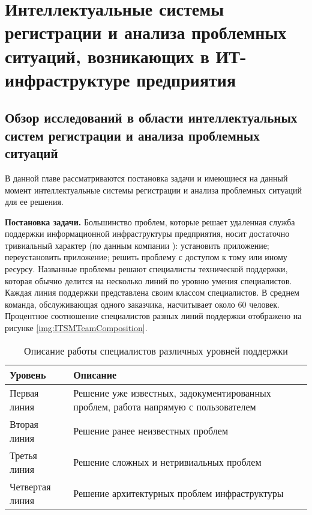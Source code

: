 \chapter{Интеллектуальные системы регистрации и анализа проблемных ситуаций, возникающих в ИТ-инфраструктуре предприятия} \label{chapt1}

\section{Обзор исследований в области интеллектуальных систем регистрации и анализа проблемных ситуаций} 
В данной главе рассматриваются постановка задачи и имеющиеся на данный момент интеллектуальные системы регистрации и анализа проблемных ситуаций для ее решения. \par

\textbf{Постановка задачи.} Большинство проблем, которые решает удаленная служба поддержки информационной инфраструктуры предприятия, носит достаточно тривиальный характер (по данным компании \icl): установить приложение; переустановить приложение; решить проблему с доступом к тому или иному ресурсу.
Названные проблемы решают специалисты технической поддержки, которая обычно делится на несколько линий по уровню умения специалистов. Каждая линия поддержки представлена своим классом специалистов. В среднем команда, обслуживающая одного заказчика, насчитывает около 60 человек. Процентное соотношение специалистов разных линий поддержки отображено на рисунке \ref{img:ITSMTeamComposition}.

\begin{table} [htbp]
  \centering
  \parbox{15cm}{\caption{Описание работы специалистов различных уровней поддержки}\label{TSSDescription}}
  \begin{tabular}{| p{7cm} | p{7cm} |}
    \hline
\textbf{Уровень} & \textbf{Описание} \\
  \hline
    

Первая линия	& Решение уже известных, задокументированных проблем, работа напрямую с пользователем \\
  \hline

Вторая линия  & Решение ранее неизвестных проблем \\
  \hline

Третья линия & Решение сложных и нетривиальных проблем \\
  \hline

Четвертая линия  & Решение архитектурных проблем инфраструктуры \\

  \hline
  
  \end{tabular}
\end{table}



